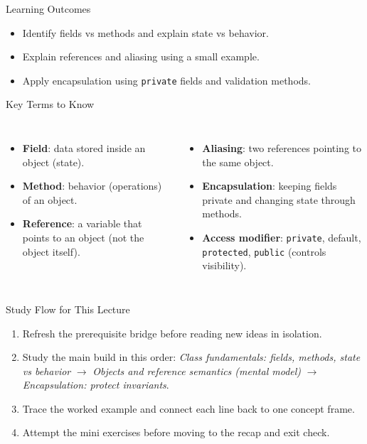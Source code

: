 \documentclass{beamer}
\begin{document}
\begin{frame}{Learning Outcomes}
  \begin{itemize}[<+->]
    \item Identify fields vs methods and explain state vs behavior.
    \item Explain references and aliasing using a small example.
    \item Apply encapsulation using \texttt{private} fields and validation methods.
  \end{itemize}
  \slidesources{\OOPSUnitIISources}
\end{frame}

\begin{frame}{Key Terms to Know}
\small
\begin{columns}[t]
\begin{itemize}
  \item \textbf{Field}: data stored inside an object (state).
  \item \textbf{Method}: behavior (operations) of an object.
  \item \textbf{Reference}: a variable that points to an object (not the object itself).
\end{itemize}
\begin{itemize}
  \item \textbf{Aliasing}: two references pointing to the same object.
  \item \textbf{Encapsulation}: keeping fields private and changing state through methods.
  \item \textbf{Access modifier}: \texttt{private}, default, \texttt{protected}, \texttt{public} (controls visibility).
\end{itemize}
\end{columns}
  \slidesources{\OOPSUnitIISources}
\end{frame}

\begin{frame}{Study Flow for This Lecture}
\begin{enumerate}[<+->]
  \item Refresh the prerequisite bridge before reading new ideas in isolation.
  \item Study the main build in this order: \textit{Class fundamentals: fields, methods, state vs behavior} $\rightarrow$ \textit{Objects and reference semantics (mental model)} $\rightarrow$ \textit{Encapsulation: protect invariants}.
  \item Trace the worked example and connect each line back to one concept frame.
  \item Attempt the mini exercises before moving to the recap and exit check.
\end{enumerate}
  \slidesources{\OOPSUnitIISources}
\end{frame}
\end{document}
